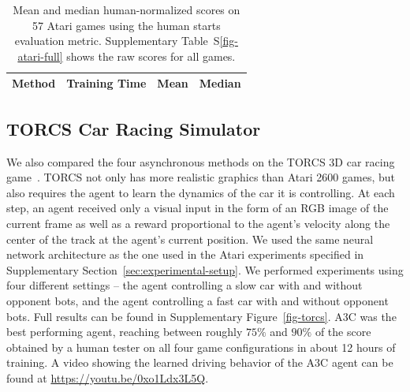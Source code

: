 \begin{table}
\small
\begin{center}
\begin{tabular}{ | l | c | c | c | }
\hline
Method & Training Time & Mean & Median \\
\hline\hline
%
%
%
%
%
%
%

\hline
\end{tabular}
\caption{\label{fig-atari-stats}
    Mean and median human-normalized scores on 57 Atari games using the human starts evaluation metric.  Supplementary Table~S\ref{fig-atari-full} shows the raw scores for all games.
}
\end{center}
\vspace{-0.45cm}
\end{table}

\subsection{TORCS Car Racing Simulator}

%
%
%
%
%
%
%

%
%
%
%
%
%
%
%
%
%
%

We also compared the four asynchronous methods on the TORCS 3D car racing game~\citep{wymann-torcs}.
TORCS not only has more realistic graphics than Atari 2600 games, but also requires the agent to learn the dynamics of the car it is controlling.
At each step, an agent received only a visual input in the form of an RGB image of the current frame as well as a reward proportional to the agent's velocity along the center of the track at the agent's current position.
%
We used the same neural network architecture as the one used in the Atari experiments specified in Supplementary Section~\ref{sec:experimental-setup}.
We performed experiments using four different settings -- the agent controlling a slow car with and without opponent bots, and the agent controlling a fast car with and without opponent bots.
Full results can be found in Supplementary Figure~\ref{fig-torcs}.
%
%
%
A3C was the best performing agent, reaching between roughly $75\%$ and $90\%$ of the score obtained by a human tester on all four game configurations in about 12 hours of training.
%
A video showing the learned driving behavior of the A3C agent can be found at \url{https://youtu.be/0xo1Ldx3L5Q}.
%

%

